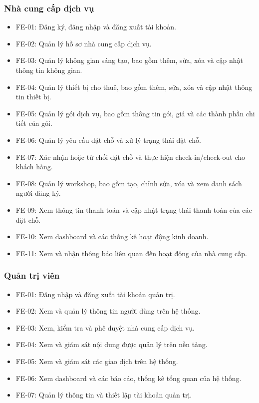 \subsubsection{Nhà cung cấp dịch vụ}
\begin{itemize}
	\item FE-01: Đăng ký, đăng nhập và đăng xuất tài khoản.
	\item FE-02: Quản lý hồ sơ nhà cung cấp dịch vụ.
	\item FE-03: Quản lý không gian sáng tạo, bao gồm thêm, sửa, xóa và cập nhật thông tin không gian.
	\item FE-04: Quản lý thiết bị cho thuê, bao gồm thêm, sửa, xóa và cập nhật thông tin thiết bị.
	\item FE-05: Quản lý gói dịch vụ, bao gồm thông tin gói, giá và các thành phần chi tiết của gói.
	\item FE-06: Quản lý yêu cầu đặt chỗ và xử lý trạng thái đặt chỗ.
	\item FE-07: Xác nhận hoặc từ chối đặt chỗ và thực hiện check-in/check-out cho khách hàng.
	\item FE-08: Quản lý workshop, bao gồm tạo, chỉnh sửa, xóa và xem danh sách người đăng ký.
	\item FE-09: Xem thông tin thanh toán và cập nhật trạng thái thanh toán của các đặt chỗ.
	\item FE-10: Xem dashboard và các thống kê hoạt động kinh doanh.
	\item FE-11: Xem và nhận thông báo liên quan đến hoạt động của nhà cung cấp.
\end{itemize}

\subsubsection{Quản trị viên}
\begin{itemize}
	\item FE-01: Đăng nhập và đăng xuất tài khoản quản trị.
	\item FE-02: Xem và quản lý thông tin người dùng trên hệ thống.
	\item FE-03: Xem, kiểm tra và phê duyệt nhà cung cấp dịch vụ.
	\item FE-04: Xem và giám sát nội dung được quản lý trên nền tảng.
	\item FE-05: Xem và giám sát các giao dịch trên hệ thống.
	\item FE-06: Xem dashboard và các báo cáo, thống kê tổng quan của hệ thống.
	\item FE-07: Quản lý thông tin và thiết lập tài khoản quản trị.
\end{itemize}

